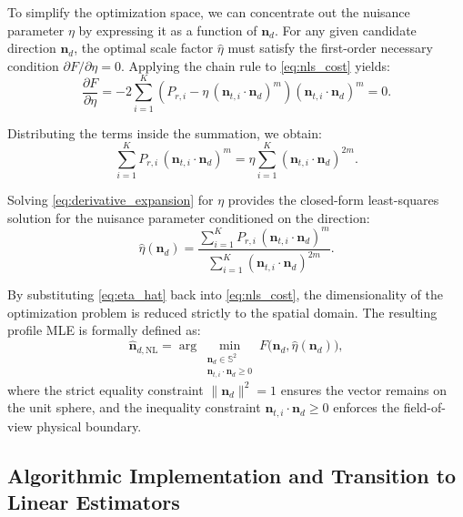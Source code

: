 \documentclass[journal]{IEEEtran}
\begin{document}
To simplify the optimization space, we can concentrate out the nuisance parameter $\eta$ by expressing it as a function of $\mathbf{n}_d$. For any given candidate direction $\mathbf{n}_d$, the optimal scale factor $\hat{\eta}$ must satisfy the first-order necessary condition $\partial F / \partial \eta = 0$. Applying the chain rule to \eqref{eq:nls_cost} yields:
\begin{equation}
    \frac{\partial F}{\partial \eta} = -2 \sum_{i=1}^{K} \left( P_{r,i} - \eta\,(\mathbf{n}_{t,i}\cdot\mathbf{n}_d)^{m} \right) (\mathbf{n}_{t,i}\cdot\mathbf{n}_d)^{m} = 0.
    \label{eq:partial_derivative}
\end{equation}

Distributing the terms inside the summation, we obtain:
\begin{equation}
    \sum_{i=1}^{K} P_{r,i}\,(\mathbf{n}_{t,i}\cdot\mathbf{n}_d)^{m} = \eta \sum_{i=1}^{K} (\mathbf{n}_{t,i}\cdot\mathbf{n}_d)^{2m}.
    \label{eq:derivative_expansion}
\end{equation}

Solving \eqref{eq:derivative_expansion} for $\eta$ provides the closed-form least-squares solution for the nuisance parameter conditioned on the direction:
\begin{equation}
  \hat\eta(\mathbf{n}_d)
  = \frac{\displaystyle\sum_{i=1}^{K} P_{r,i}\,
    (\mathbf{n}_{t,i}\cdot\mathbf{n}_d)^{m}}
   {\displaystyle\sum_{i=1}^{K}
    (\mathbf{n}_{t,i}\cdot\mathbf{n}_d)^{2m}}.
  \label{eq:eta_hat}
\end{equation}

By substituting \eqref{eq:eta_hat} back into \eqref{eq:nls_cost}, the dimensionality of the optimization problem is reduced strictly to the spatial domain. The resulting profile MLE is formally defined as:
\begin{equation}
  \hat{\mathbf{n}}_{d,\text{NL}}
  = \arg\min_{\substack{\mathbf{n}_d\in\mathbb{S}^{2} \\
                         \mathbf{n}_{t,i}\cdot\mathbf{n}_d\ge0}}
    F\bigl(\mathbf{n}_d, \hat\eta(\mathbf{n}_d)\bigr),
  \label{eq:profile_mle}
\end{equation}
where the strict equality constraint $\|\mathbf{n}_d\|^2 = 1$ ensures the vector remains on the unit sphere, and the inequality constraint $\mathbf{n}_{t,i}\cdot\mathbf{n}_d\ge0$ enforces the field-of-view physical boundary.

\subsection{Algorithmic Implementation and Transition to Linear Estimators}
\end{document}
